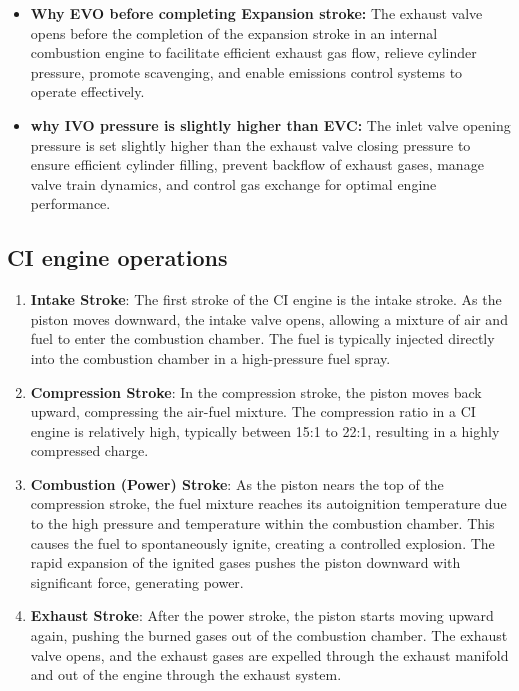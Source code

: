 \documentclass{article}
\begin{document}
\begin{itemize}
	\item \textbf{Why EVO before completing Expansion stroke:} The exhaust valve opens before the completion of the expansion stroke in an internal combustion engine to facilitate efficient exhaust gas flow, relieve cylinder pressure, promote scavenging, and enable emissions control systems to operate effectively.
	\item \textbf{why IVO pressure is slightly higher than EVC:} The inlet valve opening pressure is set slightly higher than the exhaust valve closing pressure to ensure efficient cylinder filling, prevent backflow of exhaust gases, manage valve train dynamics, and control gas exchange for optimal engine performance.

\end{itemize}

\subsection*{CI engine operations}
\begin{enumerate}
	\item \textbf{Intake Stroke}: The first stroke of the CI engine is the intake stroke. As the piston moves downward, the intake valve opens, allowing a mixture of air and fuel to enter the combustion chamber. The fuel is typically injected directly into the combustion chamber in a high-pressure fuel spray.

	\item \textbf{Compression Stroke}: In the compression stroke, the piston moves back upward, compressing the air-fuel mixture. The compression ratio in a CI engine is relatively high, typically between 15:1 to 22:1, resulting in a highly compressed charge.
	
	\item \textbf{Combustion (Power) Stroke}: As the piston nears the top of the compression stroke, the fuel mixture reaches its autoignition temperature due to the high pressure and temperature within the combustion chamber. This causes the fuel to spontaneously ignite, creating a controlled explosion. The rapid expansion of the ignited gases pushes the piston downward with significant force, generating power.
	
	\item \textbf{Exhaust Stroke}: After the power stroke, the piston starts moving upward again, pushing the burned gases out of the combustion chamber. The exhaust valve opens, and the exhaust gases are expelled through the exhaust manifold and out of the engine through the exhaust system.
\end{enumerate}
\end{document}
